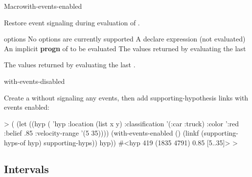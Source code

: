 \documentclass[10pt,twoside,english,pdftex]{article}
\begin{document}
\begin{functiondoc}{Macro}{with-events-enabled}%
  {\code{(}\superstar{}\code{)}
    \superstar{}
    \superstar{}
    \returns{} \superstar}
%
%
  
\fnsyntax

\fnpurpose Restore event signaling during evaluation of .

\fnpackage {}

\fnmodule {}

\fnargs
\begin{args}{options}
\arg[option] No options are currently supported
\arg[declaration] A declare expression (not evaluated)
\arg[forms] An implicit \textbf{progn} of  to be evaluated
\arg[results] The values returned by evaluating the last 
\end{args}

\fnreturns The values returned by evaluating the last .

\begin{alsos}{with-events-disabled}
\end{alsos}

\fnexample
{}%
Create a  without signaling any events, then add
supporting-hypothesis links with events enabled:
%
\W\supp
\begin{example}
  > (
       (let ((hyp ( 'hyp 
                     :location (list x y)
                     :classification '(:car :truck)
                     :color ':red
                     :belief .85
                     :velocity-range '(5 35))))
          (with-events-enabled ()
             (linkf (supporting-hyps-of hyp) supporting-hyps))
          hyp))
  #<hyp 419 (1835 4791) 0.85 [5..35]>
  >
\end{example}

\end{functiondoc}


\T\markright{}%
\T\pagestyle{plain}
\T\clearpage
\W{}
\T\pagestyle{fancy}
\T\thispagestyle{fancybottom}
\T\global\def\fnlastname{ }%

\subsection{Intervals}
\label{sec:interval}%
\end{document}
